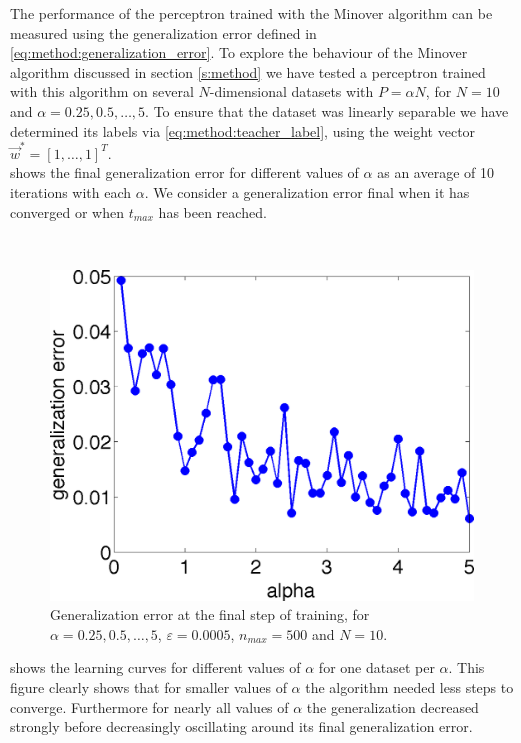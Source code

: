 The performance of the perceptron trained with the Minover algorithm can be measured using the generalization error defined in \autoref{eq:method:generalization_error}. To explore the behaviour of the Minover algorithm discussed in section \ref{s:method} we have tested a perceptron trained with this algorithm on several $N$-dimensional datasets with $P = \alpha N$, for $N = 10$ and $\alpha = 0.25, 0.5, \dotsc, 5$. To ensure that the dataset was linearly separable we have determined its labels via \eqref{eq:method:teacher_label}, using the weight vector $\vec{w}^* = [1, \dotsc, 1]^T$.\\

 shows the final generalization error for different values of $\alpha$ as an average of 10 iterations with each $\alpha$. We consider a generalization error final when it has converged or when $t_{max}$ has been reached. 

~\\

\begin{figure}[H]
	\centering
	\includegraphics[width=0.9\columnwidth]{./img/finalgeneralizationerrors}
	\caption{Generalization error at the final step of training, for $\alpha = 0.25, 0.5, \dotsc, 5$, $\varepsilon = 0.0005$, $n_{max} = 500$ and $N = 10$.}
	\label{fig:exp:finalgeneralizationError}
\end{figure}

 shows the learning curves for different values of $\alpha$ for one dataset per $\alpha$. This figure clearly shows that for smaller values of $\alpha$ the algorithm needed less steps to converge. Furthermore for nearly all values of $\alpha$ the generalization decreased strongly before decreasingly oscillating around its final generalization error.

